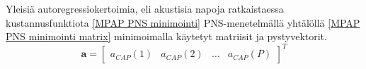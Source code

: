 \documentclass[finnish,12pt]{article}
\begin{document}
Yleisiä autoregressiokertoimia, eli akustisia napoja ratkaistaessa kustannusfunktiota \eqref{MPAP PNS minimointi} PNS-menetelmällä yhtälöllä \eqref{MPAP PNS minimointi matrix} minimoimalla  käytetyt matriisit ja pystyvektorit.
\begin{equation}
\textbf{a} = \begin{bmatrix}
a_{CAP}(1) & a_{CAP}(2) & \hdots & a_{CAP}(P)
\end{bmatrix}^T
\end{equation}
\end{document}

